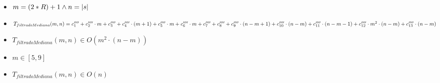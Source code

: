 \documentclass{article}
\begin{document}
    \begin{itemize}
        \item $m = (2*R) + 1 \wedge n = |s|$
        \item $T_{filtradoMediana}(m, n) = c^{\prime\prime\prime\prime}_1+
                                       c^{\prime\prime\prime\prime}_2 \cdot m+
                                       c^{\prime\prime\prime\prime}_3+
                                       c^{\prime\prime\prime\prime}_4 \cdot (m+1)+
                                       c^{\prime\prime\prime\prime}_5 \cdot m+
                                       c^{\prime\prime\prime\prime}_6 \cdot m+
                                       c^{\prime\prime\prime\prime}_7+
                                       c^{\prime\prime\prime\prime}_8+
                                       c^{\prime\prime\prime\prime}_9 \cdot (n-m+1)+ \\
                                       c^{\prime\prime\prime\prime}_{10} \cdot (n-m)+
                                       c^{\prime\prime\prime\prime}_{11} \cdot (n-m-1)+
                                       c^{\prime\prime\prime\prime}_{12} \cdot m^2 \cdot (n-m)+
                                       c^{\prime\prime\prime\prime}_{13} \cdot (n-m)$
        \item $T_{filtradoMediana}(m, n) \in O(m^2 \cdot (n - m))$
        \item $ m \in [5,9]$
        \item $T_{filtradoMediana}(m, n) \in O(n)$
    \end{itemize}
\end{document}
